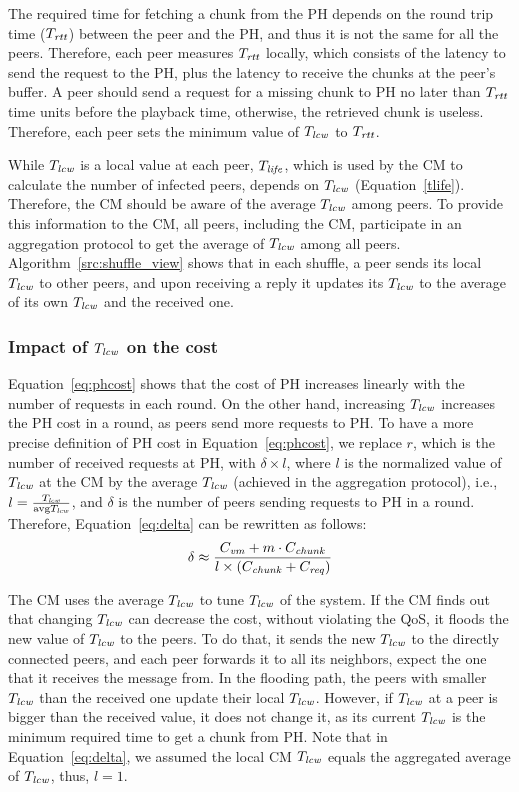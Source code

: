 The required time for fetching a chunk from the PH depends on the round trip
time ($T_{\mathit{rtt}}$) between the peer and the PH, and thus it is not the same for all the
peers. Therefore, each peer measures $T_{\mathit{rtt}}$ locally, which consists of the
latency to send the request to the PH, plus the latency to receive the chunks at
the peer's buffer. A peer should send a request for a missing chunk to PH no
later than $T_{\mathit{rtt}}$ time units before the playback time, otherwise, the retrieved chunk is
useless. Therefore, each peer sets the minimum value of $T_{\mathit{lcw}}$ to $T_{\mathit{rtt}}$.

While $T_{\mathit{lcw}}$ is a local value at each peer, $T_{\mathit{life}}$, which is used by the CM to
calculate the number of infected peers, depends on $T_{\mathit{lcw}}$
(Equation~\ref{tlife}). Therefore, the CM should be aware of the average $T_{\mathit{lcw}}$
among peers. To provide this information to the CM, all peers, including the CM,
participate in an aggregation protocol to get the average of $T_{\mathit{lcw}}$ among all
peers. Algorithm~\ref{src:shuffle_view} shows that in each shuffle, a peer
sends its local $T_{\mathit{lcw}}$ to other peers, and upon receiving a reply it updates
its $T_{\mathit{lcw}}$ to the average of its own $T_{\mathit{lcw}}$ and the received one.

\subsubsection{Impact of $T_{\mathit{lcw}}$ on the cost} 

Equation~\ref{eq:phcost} shows that the cost of PH increases linearly with
the  number of requests in each round. On the other hand, increasing
$T_{\mathit{lcw}}$ increases the PH cost in a round, as peers send more requests to PH.
To have a more precise definition of PH cost in Equation~\ref{eq:phcost}, we
replace $r$, which is the number of received requests at PH, with $\delta
\times l$, where $l$ is the normalized value of $T_{\mathit{lcw}}$ at the CM by the average
$T_{\mathit{lcw}}$ (achieved in the aggregation protocol), i.e., $l =
\frac{T_{\mathit{lcw}}}{\textrm{avg}T_{\mathit{lcw}}}$, and $\delta$ is the number of peers sending
requests to PH in a round. Therefore, Equation~\ref{eq:delta} can be rewritten
as follows:
\begin{equation}\label{eq:newdelta}
\delta \approx \frac{C_{\mathit{vm}} + m \cdot C_{\mathit{chunk}}}{l \times (C_{\mathit{chunk}} + C_{\mathit{req}})}
\end{equation}

The CM uses the average $T_{\mathit{lcw}}$ to tune $T_{\mathit{lcw}}$ of the system. If the CM finds out
that changing $T_{\mathit{lcw}}$ can decrease the cost, without violating the QoS, it
floods the new value of $T_{\mathit{lcw}}$ to the peers. To do that, it sends the new
$T_{\mathit{lcw}}$ to the directly connected peers, and each peer forwards it to all its
neighbors, expect the one that it receives the message from. In the flooding
path, the peers with smaller $T_{\mathit{lcw}}$ than the received one update their local
$T_{\mathit{lcw}}$. However, if $T_{\mathit{lcw}}$ at a peer is bigger than the received value, it
does not change it, as its current $T_{\mathit{lcw}}$ is the minimum required time to get
a chunk from PH. Note that in Equation~\ref{eq:delta}, we assumed the local CM
$T_{\mathit{lcw}}$ equals the aggregated average of $T_{\mathit{lcw}}$, thus, $l=1$.

